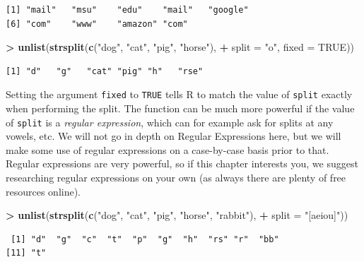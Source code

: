 \documentclass[
]{krantz}
\makeatletter
\newenvironment{Shaded}{\begin{snugshade}}{\end{snugshade}}
\newcommand{\DataTypeTok}[1]{\textcolor[rgb]{0.27,0.27,0.27}{#1}}
\newcommand{\KeywordTok}[1]{\textcolor[rgb]{0.27,0.27,0.27}{\textbf{#1}}}
\newcommand{\NormalTok}[1]{#1}
\newcommand{\OperatorTok}[1]{\textcolor[rgb]{0.43,0.43,0.43}{\textbf{#1}}}
\newcommand{\OtherTok}[1]{\textcolor[rgb]{0.37,0.37,0.37}{#1}}
\newcommand{\StringTok}[1]{\textcolor[rgb]{0.5,0.5,0.5}{#1}}
\newenvironment{kframe}{%
\medskip{}
\setlength{\fboxsep}{.8em}
 \def\at@end@of@kframe{}%
 \ifinner\ifhmode%
  \def\at@end@of@kframe{\end{minipage}}%
  \begin{minipage}{\columnwidth}%
 \fi\fi%
 \def\FrameCommand##1{\hskip\@totalleftmargin \hskip-\fboxsep
 \colorbox{shadecolor}{##1}\hskip-\fboxsep
     \hskip-\linewidth \hskip-\@totalleftmargin \hskip\columnwidth}%
 \MakeFramed {\advance\hsize-\width
   \@totalleftmargin\z@ \linewidth\hsize
   \@setminipage}}%
 {\par\unskip\endMakeFramed%
 \at@end@of@kframe}
\renewenvironment{Shaded}{\begin{kframe}}{\end{kframe}}
\makeatother
\begin{document}
\begin{verbatim}
[1] "mail"   "msu"    "edu"    "mail"   "google"
[6] "com"    "www"    "amazon" "com"   
\end{verbatim}

\begin{Shaded}
\begin{Highlighting}[]
\OperatorTok{\textgreater{}}\StringTok{ }\KeywordTok{unlist}\NormalTok{(}\KeywordTok{strsplit}\NormalTok{(}\KeywordTok{c}\NormalTok{(}\StringTok{"dog"}\NormalTok{, }\StringTok{"cat"}\NormalTok{, }\StringTok{"pig"}\NormalTok{, }\StringTok{"horse"}\NormalTok{), }
\OperatorTok{+}\StringTok{                 }\DataTypeTok{split =} \StringTok{"o"}\NormalTok{, }\DataTypeTok{fixed =} \OtherTok{TRUE}\NormalTok{))}
\end{Highlighting}
\end{Shaded}

\begin{verbatim}
[1] "d"   "g"   "cat" "pig" "h"   "rse"
\end{verbatim}

Setting the argument \texttt{fixed} to \texttt{TRUE} tells R to match the value of \texttt{split} exactly when performing the split. The function can be much more powerful if the value of \texttt{split} is a \emph{regular expression}, which can for example ask for splits at any vowels, etc. We will not go in depth on Regular Expressions here, but we will make some use of regular expressions on a case-by-case basis prior to that. Regular expressions are very powerful, so if this chapter interests you, we suggest researching regular expressions on your own (as always there are plenty of free resources online).

\begin{Shaded}
\begin{Highlighting}[]
\OperatorTok{\textgreater{}}\StringTok{ }\KeywordTok{unlist}\NormalTok{(}\KeywordTok{strsplit}\NormalTok{(}\KeywordTok{c}\NormalTok{(}\StringTok{"dog"}\NormalTok{, }\StringTok{"cat"}\NormalTok{, }\StringTok{"pig"}\NormalTok{, }\StringTok{"horse"}\NormalTok{, }\StringTok{"rabbit"}\NormalTok{), }
\OperatorTok{+}\StringTok{                 }\DataTypeTok{split =} \StringTok{"[aeiou]"}\NormalTok{))}
\end{Highlighting}
\end{Shaded}

\begin{verbatim}
 [1] "d"  "g"  "c"  "t"  "p"  "g"  "h"  "rs" "r"  "bb"
[11] "t" 
\end{verbatim}
\end{document}
